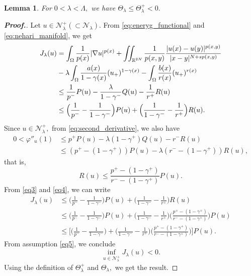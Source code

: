\documentclass[11pt]{article}
\newtheorem{lemma}{Lemma}[section] %
\newcommand{\Th} {\Theta}
\newcommand{\ga} {\gamma}
\newcommand{\om} {\Omega}
\newcommand{\la} {\lambda}
\newcommand{\La} {\Lambda}
\newcommand{\grad}{\nabla}
\begin{document}
\begin{lemma}\label{lm:Nehari_positive}
For $0<\la<\La,$
we have $\Th_\la\le\Th_\la^+<0.$
\end{lemma}


\begin{proof}[\bf Proof.]
    Let $u\in \mathcal{N}_\la^+(\subset\mathcal{N}_\la).$
From \eqref{eq:eneryg_functional} and 
\eqref{eq:nehari_manifold}, we get 
    \begin{align}\label{eq3}
        J_\la(u)
        & = 
\int_\om 
\frac{1}{p(x)}|\grad u|^{p(x)}+\iint_{\mathbb{R}^{2N}} 
\frac{1}{p(x,y)}
\frac{|u(x)-u(y)|^{p(x,y)}}{|x-y|^{N+sp(x,y)}}    \notag \\
& -\la
\int_\om 
\frac{a(x)}{1-\ga(x)}(u_+)^{1-\ga(x)}  
 -
\int_\om 
\frac{b(x)}{r(x)}(u_+)^{r(x)}\nonumber\\
        &\le 
\frac{1}{p^-}P(u)-
\frac{\la}{1-\ga^-}Q(u)-
\frac{1}{r^+}R(u)\nonumber\\
        & \le 
\Big (
\frac{1}{p^-}-
\frac{1}{1-\ga^-} 
\Big )  P(u)+ 
\Big (
\frac{1}{1-\ga^-}-
\frac{1}{r^+} \Big )
 R(u).
    \end{align}
    Since $u\in \mathcal{N}_\la^+,$
from \eqref{eq:second_derivative}, we also have 
     \begin{align*}
0<\varphi''_u(1)&\le p^+P(u)-\la(1-\ga^+)Q(u)-r^-R(u)\\
        &\le (p^+-(1-\ga^+))P(u)-\la(r^--(1-\ga^+))R(u),
    \end{align*}
      that is,
       \begin{equation}\label{eq4}
R(u)\le 
\frac{p^+-(1-\ga^+)}{r^--(1-\ga^+)}P(u).
    \end{equation}
    From \eqref{eq3} and \eqref{eq4}, we can write
        \begin{align*}
        J_\la(u)
&\le \Big (
\frac{1}{p^-}-
\frac{1}{1-\ga^-} \Big ) P(u)+ 
\Big (
\frac{1}{1-\ga^-}-
\frac{1}{r^+} \Big ) R(u)\\
        & \le \Big (
\frac{1}{p^-}-
\frac{1}{1-\ga^-} \Big ) P(u)+ \Big (
\frac{1}{1-\ga^-}-
\frac{1}{r^+} \Big ) \Big (
\frac{p^+-(1-\ga^+)}{r^--(1-\ga^+)}\Big ) P(u)\\
        &\le 
\Big [ \Big (
\frac{1}{p^-}-
\frac{1}{1-\ga^-} \Big ) + \Big (
\frac{1}{1-\ga^-}-
\frac{1}{r^+} \Big ) \Big (
\frac{p^+-(1-\ga^+)}{r^--(1-\ga^+)}\Big ) \Big ] P(u).
    \end{align*}
    From assumption \eqref{eq5}, we conclude
    $$\inf_{u\in \mathcal{N}_\la^+}J_\la(u)< 0.$$
   Using the definition of $\Th_\la^+$
and $\Th_\la,$
we get the result.
\end{proof}
\end{document}
